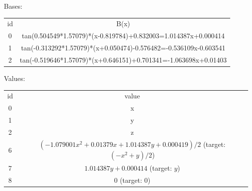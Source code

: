 Bases:\\
\begin{tabular}{cc}
id&B(x)\\
0&tan(0.504549*1.57079)*(x-0.819784)+0.832003=1.014387x+0.000414\\
1&tan(-0.313292*1.57079)*(x+0.050474)-0.576482=-0.536109x-0.603541\\
2&tan(-0.519646*1.57079)*(x+0.646151)+0.701341=-1.063698x+0.01403\\
\end{tabular}

Values:\\
\begin{tabular}{cc}
id&value\\
0&x\\
1&y\\
2&z\\
6& $(-1.079001x^2+0.01379x+1.014387y+0.000419)/2$ (target: $(-x^2+y)/2$)\\
7& $1.014387y+0.000414$ (target: $y$)\\
8& 0 (target: 0)\\
\end{tabular}

